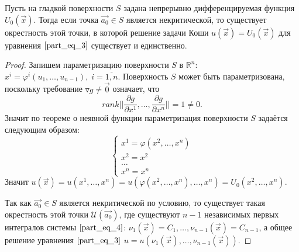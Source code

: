 \documentclass[a4paper, 12pt]{article}
\begin{document}
    \begin{theorem}
        Пусть на гладкой поверхности $S$ задана непрерывно дифференцируемая функция $U_0 \left( \overrightarrow{x} \right)$. Тогда если точка $\overrightarrow{a_0} \in S$ является некритической, то существует окрестность этой точки, в которой решение задачи Коши $u \left( \overrightarrow{x} \right) = U_0 \left( \overrightarrow{x} \right)$ для уравнения $\eqref{part_eq_3}$ существует и единственно.
    \end{theorem}
    \begin{proof}
        Запишем параметризацию поверхности $S$ в $\mathbb{R}^n$: $x^i = \varphi^i \left( u_1, \dots, u_{n - 1} \right), \; i = \overline{1, n}$. Поверхность $S$ может быть параметризована, поскольку требование $\triangledown g \neq \overrightarrow{0}$ означает, что 
        \begin{equation*}
            rank \bigg| \bigg| \frac{\partial g}{\partial x^{1}}, \dots, \frac{\partial g}{\partial x^{n}} \bigg| \bigg| = 1 \neq 0.
        \end{equation*}
        Значит по теореме о неявной функции параметризация поверхности $S$ задаётся следующим образом:
        \begin{equation*}
            \begin{cases}
                x^1 = \varphi \left( x^2, \dots, x^n \right) \\
                x^2 = x^2                                    \\
                \dots                                        \\
                x^n = x^n
            \end{cases}
        \end{equation*}
        Значит $u \left( \overrightarrow{x} \right) = u \left( x^1, \dots, x^n \right) = u \left( \varphi \left( x^2, \dots, x^n \right), \dots, x^n \right) = U_0 \left( x^2, \dots, x^n \right)$.

        Так как $\overrightarrow{a_0} \in S$ является некритической по условию, то существует такая окрестность этой точки $\mathcal{U}  \left( \overrightarrow{a_0} \right)$, где существуют $n - 1$ независимых первых интегралов системы $\eqref{part_eq_4}$: $\nu_1 \left( \overrightarrow{x} \right) = C_1, \dots, \nu_{n - 1} \left( \overrightarrow{x} \right) = C_{n - 1}$, а общее решение уравнения $\eqref{part_eq_3}$ $u = u \left( \nu_1 \left( \overrightarrow{x} \right), \dots, \nu_{n - 1} \left( \overrightarrow{x} \right) \right)$. 


\end{proof}
\end{document}
